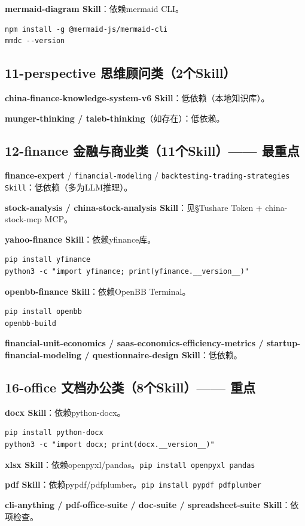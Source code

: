 \textbf{mermaid-diagram Skill}：依赖mermaid CLI。
\begin{lstlisting}[style=shell]
npm install -g @mermaid-js/mermaid-cli
mmdc --version
\end{lstlisting}

\subsection{11-perspective 思维顾问类（2个Skill）}
\textbf{china-finance-knowledge-system-v6 Skill}：低依赖（本地知识库）。

\textbf{munger-thinking / taleb-thinking}（如存在）：低依赖。

\subsection{12-finance 金融与商业类（11个Skill）—— 最重点}
\textbf{finance-expert} / \texttt{financial-modeling} / \texttt{backtesting-trading-strategies Skill}：低依赖（多为LLM推理）。

\textbf{stock-analysis / china-stock-analysis Skill}：见§Tushare Token + china-stock-mcp MCP。

\textbf{yahoo-finance Skill}：依赖yfinance库。
\begin{lstlisting}[style=shell]
pip install yfinance
python3 -c "import yfinance; print(yfinance.__version__)"
\end{lstlisting}
\textbf{openbb-finance Skill}：依赖OpenBB Terminal。
\begin{lstlisting}[style=shell]
pip install openbb
openbb-build
\end{lstlisting}
\textbf{financial-unit-economics / saas-economics-efficiency-metrics / startup-financial-modeling / questionnaire-design Skill}：低依赖。

\subsection{16-office 文档办公类（8个Skill）—— 重点}
\textbf{docx Skill}：依赖python-docx。
\begin{lstlisting}[style=shell]
pip install python-docx
python3 -c "import docx; print(docx.__version__)"
\end{lstlisting}
\textbf{xlsx Skill}：依赖openpyxl/pandas。\texttt{pip install openpyxl pandas}

\textbf{pdf Skill}：依赖pypdf/pdfplumber。\texttt{pip install pypdf pdfplumber}

\textbf{cli-anything / pdf-office-suite / doc-suite / spreadsheet-suite Skill}：依项检查。

